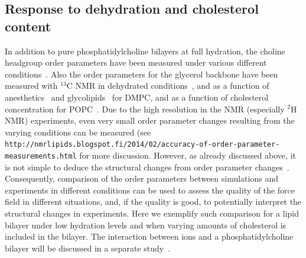 \documentclass[pre,aps,floatfix,authordate1-4,twocolumn]{revtex4-1}
\begin{document}
\subsection{Response to dehydration and cholesterol content}
In addition to pure phosphatidylcholine bilayers at full hydration, the choline headgroup order parameters
have been measured under various different conditions~\cite{gally75,brown77,brown78,akutsu81,altenbach84,scherer89,bechinger91,ulrich94,dvinskikh05b,castro08,kapla12,ferreira13}.
Also the order parameters for the glycerol backbone have been measured with $^{13}$C NMR in dehydrated conditions~\cite{dvinskikh05b}, and as a function 
of anesthetics~\cite{castro08} and glycolipids~\cite{kapla12} for DMPC, and as a function of cholesterol 
concentration for POPC~\cite{ferreira13}. Due to the high resolution in the NMR (especially $^2$H NMR) experiments,
even very small order parameter changes resulting from the varying conditions can be measured (see
\texttt{http://nmrlipids.blogspot.fi/2014/02/accuracy-of-order-parameter-measurements.html}
for more discussion.
However, as already discussed above, it is not simple to deduce 
the structural changes from order parameter changes~\cite{akutsu91,semchyschyn04}. Consequently, comparison of the order parameters
between simulations and experiments in different conditions can be used to assess the quality of the force field 
in different situations, and, if the quality is good, to potentially interpret the structural changes in experiments.
Here we exemplify such comparison for a lipid bilayer under low hydration levels and when varying amounts of cholesterol is included in the bilayer. 
The interaction between ions and a phosphatidylcholine bilayer will be discussed in a separate study~\cite{ionpaper}.
\end{document}
